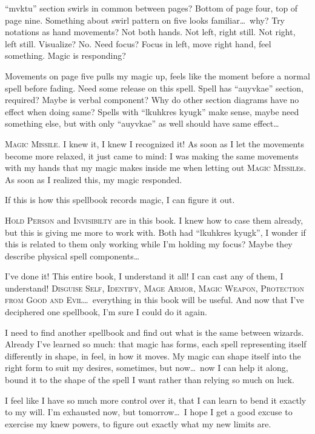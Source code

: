 \pause

``mvktu'' section swirls in common between pages? Bottom of page four, top of page nine. Something about swirl pattern on five looks familiar\dots\ why? Try notations as hand movements? Not both hands. Not left, right still. Not right, left still. Visualize? No. Need focus? Focus in left, move right hand, feel something. Magic is responding?

Movements on page five pulls my magic up, feels like the moment before a normal spell before fading. Need some release on this spell. Spell has ``auyvkae'' section, required? Maybe is verbal component? Why do other section diagrams have no effect when doing same? Spells with ``lkuhkres kyugk'' make sense, maybe need something else, but with only ``auyvkae'' as well should have same effect\dots

\textsc{Magic Missile}. I knew it, I knew I recognized it! As soon as I let the movements become more relaxed, it just came to mind: I was making the same movements with my hands that my magic makes inside me when letting out \textsc{Magic Missile}s. As soon as I realized this, my magic responded.

If this is how this spellbook records magic, I can figure it out.

\textsc{Hold Person} and \textsc{Invisibilty} are in this book. I knew how to case them already, but this is giving me more to work with. Both had ``lkuhkres kyugk'', I wonder if this is related to them only working while I'm holding my focus? Maybe they describe physical spell components\dots

I've done it! This entire book, I understand it all! I can cast any of them, I understand! \textsc{Disguise Self}, \textsc{Identify}, \textsc{Mage Armor}, \textsc{Magic Weapon}, \textsc{Protection from Good and Evil}\dots\ everything in this book will be useful. And now that I've deciphered one spellbook, I'm sure I could do it again.

I need to find another spellbook and find out what is the same between wizards. Already I've learned so much: that magic has forms, each spell representing itself differently in shape, in feel, in how it moves. My magic can shape itself into the right form to suit my desires, sometimes, but now\dots\ now I can help it along, bound it to the shape of the spell I want rather than relying so much on luck.

I feel like I have so much more control over it, that I can learn to bend it exactly to my will. I'm exhausted now, but tomorrow\dots\ I hope I get a good excuse to exercise my knew powers, to figure out exactly what my new limits are.

\sleep
